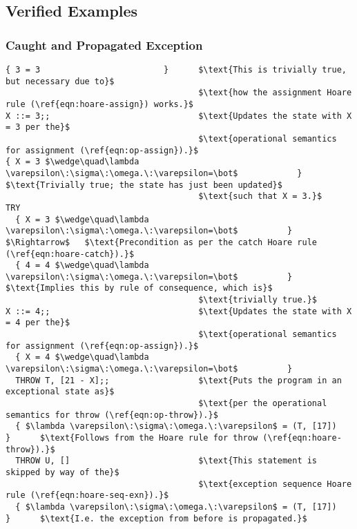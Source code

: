 \subsection{Verified Examples}

\subsubsection{Caught and Propagated Exception}

\begin{lstlisting}[mathescape=true,keepspaces=true,label=lst:hoare_ex_asgn,caption=A small program demonstrating a try-catch statement.]
{ 3 = 3                         }      $\text{This is trivially true, but necessary due to}$
                                       $\text{how the assignment Hoare rule (\ref{eqn:hoare-assign}) works.}$
X ::= 3;;                              $\text{Updates the state with X = 3 per the}$
                                       $\text{operational semantics for assignment (\ref{eqn:op-assign}).}$
{ X = 3 $\wedge\quad\lambda \varepsilon\:\sigma\:\omega.\:\varepsilon=\bot$            }      $\text{Trivially true; the state has just been updated}$
                                       $\text{such that X = 3.}$
TRY
  { X = 3 $\wedge\quad\lambda \varepsilon\:\sigma\:\omega.\:\varepsilon=\bot$          } $\Rightarrow$   $\text{Precondition as per the catch Hoare rule (\ref{eqn:hoare-catch}).}$
  { 4 = 4 $\wedge\quad\lambda \varepsilon\:\sigma\:\omega.\:\varepsilon=\bot$          }      $\text{Implies this by rule of consequence, which is}$
                                       $\text{trivially true.}$
X ::= 4;;                              $\text{Updates the state with X = 4 per the}$
                                       $\text{operational semantics for assignment (\ref{eqn:op-assign}).}$
  { X = 4 $\wedge\quad\lambda \varepsilon\:\sigma\:\omega.\:\varepsilon=\bot$          }
  THROW T, [21 - X];;                  $\text{Puts the program in an exceptional state as}$
                                       $\text{per the operational semantics for throw (\ref{eqn:op-throw}).}$
  { $\lambda \varepsilon\:\sigma\:\omega.\:\varepsilon$ = (T, [17])          }      $\text{Follows from the Hoare rule for throw (\ref{eqn:hoare-throw}).}$
  THROW U, []                          $\text{This statement is skipped by way of the}$
                                       $\text{exception sequence Hoare rule (\ref{eqn:hoare-seq-exn}).}$
  { $\lambda \varepsilon\:\sigma\:\omega.\:\varepsilon$ = (T, [17])          }      $\text{I.e. the exception from before is propagated.}$

\end{lstlisting}
